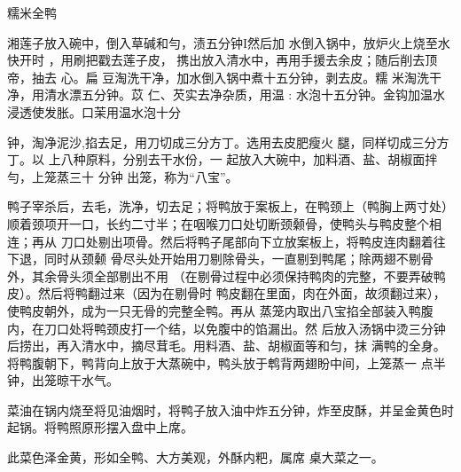 \begin{recipe}[八宝全鸭]{糯米全鸭}

\ingredients


\cooking

湘莲子放入碗中，倒入草碱和勻，渍五分钟I然后加 水倒入锅中，放炉火上烧至水快开时
，用刷把戳去莲子皮， 携出放入清水中，再用手援去余皮；随后削去顶帝，抽去 心。扁
豆淘洗干净，加水倒入锅中煮十五分钟，剥去皮。糯 米淘洗干净，用清水漂五分钟。苡
仁、芡实去净杂质，用温 : 水泡十五分钟。金钩加温水浸透使发胀。口茉用温水泡十分

钟，淘净泥沙,掐去足，用刀切成三分方丁。选用去皮肥瘦火 腿，同样切成三分方丁。以
上八种原料，分别去干水份，一 起放入大碗中，加料酒、盐、胡椒面拌勻，上笼蒸三十
分钟 出笼，称为“八宝”。

\step 鸭子宰杀后，去毛，洗净，切去足；将鸭放于案板上，在鸭颈上（鸭胸上两寸处）
顺着颈项开一口，长约二寸半；在咽喉刀口处切断颈颡骨，使鸭头与鸭皮整个相连；再从
刀口处剔出项骨。然后将鸭子尾部向下立放案板上，将鸭皮连肉翻着往下退，同时从颈颡
骨尽头处开始用刀剔除骨头，一直剔到鸭尾；除两翅不剔骨外，其余骨头须全部剔出不用
（在剔骨过程中必须保持鸭肉的完整，不要弄破鸭皮）。然后将鸭翻过来（因为在剔骨时
鸭皮翻在里面，肉在外面，故须翻过来），使鸭皮朝外，成为一只无骨的完整全鸭。再从
蒸笼内取出八宝掐全部装入鸭腹内，在刀口处将鸭颈皮打一个结，以免腹中的馅漏出。然
后放入汤锅中烫三分钟后捞出，再入清水中，摘尽茸毛。用料酒、盐、胡椒面等和匀，抹
满鸭的全身。将鸭腹朝下，鸭背向上放于大蒸碗中，鸭头放于鹎背两翅盼中间，上笼蒸一
点半钟，出笼晾干水气。

\step 菜油在锅内烧至将见油烟时，将鸭子放入油中炸五分钟，炸至皮酥，并呈金黄色时
起锅。将鸭照原形摆入盘中上席。

\notes

此菜色泽金黄，形如全鸭、大方美观，外酥内粑，属席 桌大菜之一。

\end{recipe}

